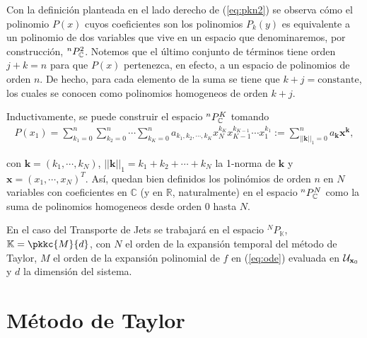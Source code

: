 Con la definición planteada en el lado derecho de (\ref{eq:pkn2}) se observa cómo el polinomio $P(x)$ cuyos coeficientes son los polinomios $P_k(y)$ es equivalente a un polinomio de dos variables que vive en un espacio que denominaremos, por construcción, ${^{n}P_{\mathbb{C}}^ 2 }$. Notemos que el último conjunto de términos tiene orden $j+k = n$ para que $P(x)$  pertenezca, en efecto, a un espacio de polinomios de orden $n$. De hecho, para cada elemento de la suma se tiene que $k+j= \text{constante}$, los cuales se conocen como polinomios homogeneos de orden $k+j$.

Inductivamente, se puede construir el espacio ${^{n}P_{\mathbb{C}}^ K }$ tomando
\begin{align}
 P(x_1) = \sum_{k_{1}=0}^n\sum_{k_2=0}^n\cdots\sum_{k_K=0}^n a_{k_{1},k_{2},\cdots,k_{K}}x_N^{k_{K}}x_{K-1}^{k_{K-1}} \cdots x_1^{k_{1}} := \sum_{||\mathbf{k}||_{1}=0}^n a_{\mathbf{k}}\mathbf{x}^{\mathbf{k}},
\label{eq:pknN}
\end{align}

con $\mathbf{k} = (k_1,\cdots,k_N)$, $||\mathbf{k}||_1 = k_1+k_2+\cdots+k_N$ la 1-norma de $\mathbf{k}$ y $\mathbf{x} = (x_1,\cdots,x_N)^T$. Así, quedan bien definidos los polinómios de orden $n$ en $N$ variables con coeficientes en $\mathbb{C}$ (y en $\mathbb{R}$, naturalmente) en el espacio ${^{n}P_{\mathbb{C}}^ N }$ como la suma de polinomios homogeneos desde orden $0$ hasta $N$.


En el caso del Transporte de Jets se trabajará en el espacio ${^{N}P_{\mathbb{K}}}$, $\mathbb{K} = \pkkc{M}{d}$, con $N$ el orden de la expansión temporal del método de Taylor, $M$ el orden de la expansión polinomial de $f$ en (\ref{eq:ode}) evaluada en $\mathcal{U}_{\mathbf{x}_0}$ y $d$ la dimensión del sistema. 

\section{Método de Taylor}
\label{sec:taylor-metodo}

